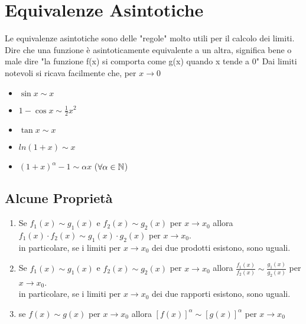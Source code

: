 \section{Equivalenze Asintotiche}
Le equivalenze asintotiche sono delle "regole" molto utili per il calcolo dei limiti.
Dire che una funzione è asintoticamente equivalente a un altra, significa bene o male dire "la funzione f(x) si comporta come g(x) quando x tende a 0"
Dai limiti notevoli si ricava facilmente che, per $x \to 0$
\begin{itemize}
	\item $\sin x \sim x$
	\item $1 - \cos x \sim \frac{1}{2}x^2$
	\item $\tan x \sim x$
	\item $ln(1+x) \sim x$
	\item $(1+x)^\alpha -1 \sim \alpha x$ ($\forall \alpha \in \mathbb{N}$)
\end{itemize}
\subsection*{Alcune Proprietà}
\begin{enumerate}
	\item Se $f_1(x) \sim g_1(x)$ e $f_2(x) \sim g_2(x)$ per $x \to x_0$ allora $f_1(x) \cdot f_2(x) \sim g_1(x) \cdot g_2(x)$ per $x \to x_0$.
	      \\in particolare, se i limiti per $x \to x_0$ dei due prodotti esistono, sono uguali.
	\item Se $f_1(x) \sim g_1(x)$ e $f_2(x) \sim g_2(x)$ per $x \to x_0$ allora $\frac{f_1(x)}{f_2(x)} \sim \frac{g_1(x)}{g_2(x)}$ per $x \to x_0$.
	      \\in particolare, se i limiti per $x \to x_0$ dei due rapporti esistono, sono uguali.
	\item se $f(x) \sim g(x)$ per $x \to x_0$ allora $[f(x)]^\alpha \sim [g(x)]^\alpha$ per $x \to x_0$
\end{enumerate}
